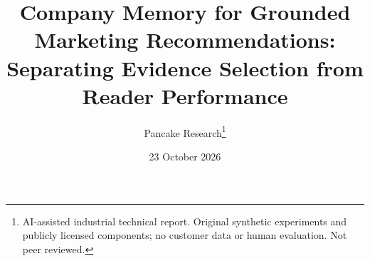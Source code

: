 \documentclass[11pt]{article}
\title{Company Memory for Grounded Marketing Recommendations:\\Separating Evidence Selection from Reader Performance}
\author{Pancake Research\thanks{AI-assisted industrial technical report. Original synthetic experiments and publicly licensed components; no customer data or human evaluation. Not peer reviewed.}}
\date{23 October 2026}
\begin{document}
\maketitle
\begin{abstract}

\end{abstract}








\clearpage
\appendix

\end{document}
